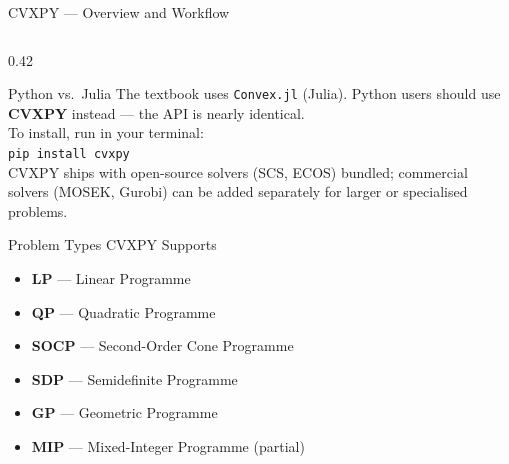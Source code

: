 \documentclass[aspectratio=169,10pt]{beamer}
\begin{document}
\begin{frame}[allowframebreaks]{CVXPY --- Overview and Workflow}
\begin{columns}
\begin{column}{0.42\textwidth}
\begin{alertblock}{Python vs.\ Julia}
        The textbook uses \texttt{Convex.jl} (Julia).  Python users
        should use \textbf{CVXPY} instead --- the API is nearly
        identical.\\[4pt]
        To install, run in your terminal:\\
        \texttt{pip install cvxpy}\\[4pt]
        CVXPY ships with open-source solvers (SCS, ECOS) bundled;
        commercial solvers (MOSEK, Gurobi) can be added separately for
        larger or specialised problems.
      \end{alertblock}
      \vspace{4pt}
      \begin{block}{Problem Types CVXPY Supports}
        \begin{itemize}
          \item \textbf{LP} --- Linear Programme
          \item \textbf{QP} --- Quadratic Programme
          \item \textbf{SOCP} --- Second-Order Cone Programme
          \item \textbf{SDP} --- Semidefinite Programme
          \item \textbf{GP} --- Geometric Programme
          \item \textbf{MIP} --- Mixed-Integer Programme (partial)
        \end{itemize}
      \end{block}
    \end{column}
  \end{columns}

\end{frame}
\end{document}
